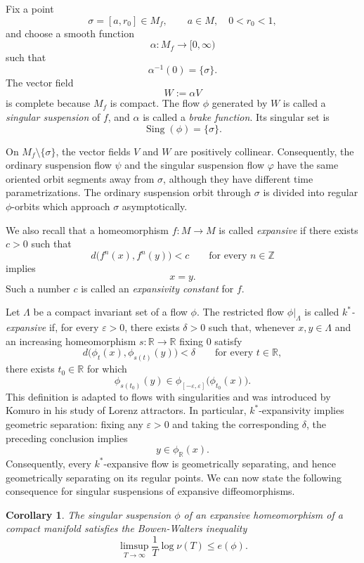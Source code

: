 \documentclass[11pt,reqno]{amsart}
\newtheorem{corollary}[theorem]{Corollary}
\theoremstyle{definition}
\theoremstyle{remark}
\newcommand{\Sing}{\operatorname{Sing}}
\begin{document}
Fix a point
\[
\sigma=[a,r_0]\in M_f,
\qquad a\in M,\quad 0<r_0<1,
\]
and choose a smooth function
\[
\alpha\colon M_f\to[0,\infty)
\]
such that
\[
\alpha^{-1}(0)=\{\sigma\}.
\]
The vector field
\[
W:=\alpha V
\]
is complete because $M_f$ is compact. The flow $\phi$ generated by $W$
is called a \emph{singular suspension} of $f$, and $\alpha$ is called a
\emph{brake function}. Its singular set is
\[
\Sing(\phi)=\{\sigma\}.
\]

On $M_f\setminus\{\sigma\}$, the vector fields $V$ and $W$ are positively
collinear. Consequently, the ordinary suspension flow $\psi$ and the
singular suspension flow $\varphi$ have the same oriented orbit segments
away from $\sigma$, although they have different time parametrizations.
The ordinary suspension orbit through $\sigma$ is divided into regular
$\phi$-orbits which approach $\sigma$ asymptotically.

We also recall that a homeomorphism $f\colon M\to M$ is called
\emph{expansive} if there exists $c>0$ such that
\[
d\bigl(f^n(x),f^n(y)\bigr)<c
\qquad\text{for every }n\in\mathbb Z
\]
implies
\[
x=y.
\]
Such a number $c$ is called an \emph{expansivity constant} for $f$.




Let $\Lambda$ be a compact invariant set of a flow
$\phi$.
The restricted flow
$\phi|_\Lambda$ is called \emph{$k^*$-expansive} if, for every
$\varepsilon>0$, there exists $\delta>0$ such that, whenever
$x,y\in\Lambda$ and an increasing homeomorphism $s:\mathbb{R}\to\mathbb{R}$ fixing $0$ satisfy
\[
d\bigl(\phi_t(x),\phi_{s(t)}(y)\bigr)<\delta
\qquad\text{for every }t\in\mathbb R,
\]
there exists $t_0\in\mathbb R$ for which
\[
\phi_{s(t_0)}(y)
   \in
\phi_{[-\varepsilon,\varepsilon]}
       \bigl(\phi_{t_0}(x)\bigr).
\]
This definition is adapted to flows with singularities and was
introduced by Komuro \cite{k1} in his study of Lorenz attractors. In particular,
$k^*$-expansivity implies geometric separation: fixing any
$\varepsilon>0$ and taking the corresponding $\delta$, the preceding
conclusion implies
\[
y\in\phi_{\mathbb R}(x).
\]
Consequently, every $k^*$-expansive flow is geometrically separating,
and hence geometrically separating on its regular points.
We can now state the following consequence for singular suspensions of expansive diffeomorphisms.

\begin{corollary}
The singular suspension $\phi$ of an expansive homeomorphism of a compact manifold satisfies the Bowen-Walters inequality
\[
\limsup_{T\to\infty}\frac{1}{T}\log\nu(T)
\leq e(\phi).
\]
\end{corollary}
\end{document}
